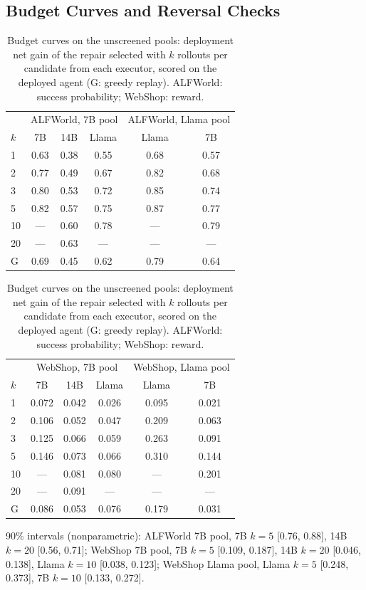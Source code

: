 \documentclass{article}
\theoremstyle{plain}
\theoremstyle{definition}
\theoremstyle{remark}
\begin{document}
\subsection{Budget Curves and Reversal Checks}
\label{app:budget}

\begin{table}[!htbp]
  \caption{Budget curves on the unscreened pools: deployment net gain of the repair selected with $k$ rollouts per candidate from each executor, scored on the deployed agent (G: greedy replay). ALFWorld: success probability; WebShop: reward.}
  \label{tab:budgetcurve}
  \centering
  \footnotesize
  \setlength{\tabcolsep}{3pt}
  \begin{tabular}{@{}lccc|cc@{}}
    \toprule
    & \multicolumn{3}{c|}{ALFWorld, 7B pool} & \multicolumn{2}{c}{ALFWorld, Llama pool} \\
    $k$ & 7B & 14B & Llama & Llama & 7B \\
    \midrule
    1 & 0.63 & 0.38 & 0.55 & 0.68 & 0.57 \\
    2 & 0.77 & 0.49 & 0.67 & 0.82 & 0.68 \\
    3 & 0.80 & 0.53 & 0.72 & 0.85 & 0.74 \\
    5 & 0.82 & 0.57 & 0.75 & 0.87 & 0.77 \\
    10 & --- & 0.60 & 0.78 & --- & 0.79 \\
    20 & --- & 0.63 & --- & --- & --- \\
    G & 0.69 & 0.45 & 0.62 & 0.79 & 0.64 \\
    \bottomrule
  \end{tabular}

  \vspace{6pt}
  \begin{tabular}{@{}lccc|cc@{}}
    \toprule
    & \multicolumn{3}{c|}{WebShop, 7B pool} & \multicolumn{2}{c}{WebShop, Llama pool} \\
    $k$ & 7B & 14B & Llama & Llama & 7B \\
    \midrule
    1 & 0.072 & 0.042 & 0.026 & 0.095 & 0.021 \\
    2 & 0.106 & 0.052 & 0.047 & 0.209 & 0.063 \\
    3 & 0.125 & 0.066 & 0.059 & 0.263 & 0.091 \\
    5 & 0.146 & 0.073 & 0.066 & 0.310 & 0.144 \\
    10 & --- & 0.081 & 0.080 & --- & 0.201 \\
    20 & --- & 0.091 & --- & --- & --- \\
    G & 0.086 & 0.053 & 0.076 & 0.179 & 0.031 \\
    \bottomrule
  \end{tabular}

  \vspace{2pt}
  {\footnotesize 90\% intervals (nonparametric): ALFWorld 7B pool, 7B $k=5$ [0.76, 0.88], 14B $k=20$ [0.56, 0.71]; WebShop 7B pool, 7B $k=5$ [0.109, 0.187], 14B $k=20$ [0.046, 0.138], Llama $k=10$ [0.038, 0.123]; WebShop Llama pool, Llama $k=5$ [0.248, 0.373], 7B $k=10$ [0.133, 0.272].}
\end{table}
\end{document}
